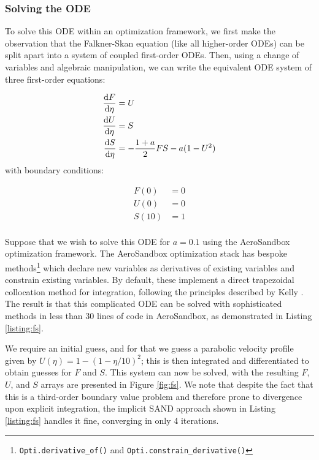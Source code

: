 \subsubsection{Solving the ODE}

To solve this ODE within an optimization framework, we first make the observation that the Falkner-Skan equation (like all higher-order ODEs) can be split apart into a system of coupled first-order ODEs. Then, using a change of variables and algebraic manipulation, we can write the equivalent ODE system of three first-order equations:

\begin{equation}
    \begin{aligned}
        \frac{\mathrm{d} F}{\mathrm{d} \eta} &= U \\
        \frac{\mathrm{d} U}{\mathrm{d} \eta} &= S \\
        \frac{\mathrm{d} S}{\mathrm{d} \eta} &= -\frac{1 + a}{2}FS - a(1-U^2)\\
    \end{aligned}
\end{equation}
\noindent
with boundary conditions:

\begin{equation*}
    \begin{aligned}
        F(0) &= 0 \\
        U(0) &= 0 \\
        S(10) &= 1 \\
    \end{aligned}
    \label{eq:fs-rewritten}
\end{equation*}

Suppose that we wish to solve this ODE for $a=0.1$ using the AeroSandbox optimization framework. The AeroSandbox optimization stack has bespoke methods\footnote{\texttt{Opti.derivative_of()} and \texttt{Opti.constrain_derivative()}} which declare new variables as derivatives of existing variables and constrain existing variables. By default, these implement a direct trapezoidal collocation method for integration, following the principles described by Kelly \cite{mpk2017}. The result is that this complicated ODE can be solved with sophisticated methods in less than 30 lines of code in AeroSandbox, as demonstrated in Listing \ref{listing:fs}.

We require an initial guess, and for that we guess a parabolic velocity profile given by $U(\eta) = 1 - (1 - \eta/10)^2$; this is then integrated and differentiated to obtain guesses for $F$ and $S$. This system can now be solved, with the resulting $F$, $U$, and $S$ arrays are presented in Figure \ref{fig:fs}. We note that despite the fact that this is a third-order boundary value problem and therefore prone to divergence upon explicit integration, the implicit SAND approach shown in Listing \ref{listing:fs} handles it fine, converging in only 4 iterations.

